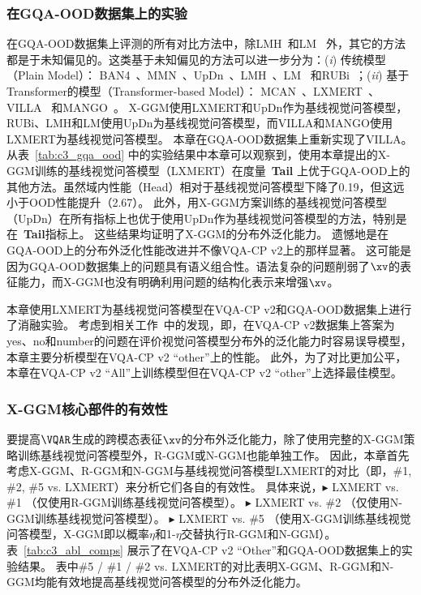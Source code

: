 \subsubsection{在GQA-OOD数据集上的实验}
在GQA-OOD数据集上评测的所有对比方法中，除LMH~\cite{clark2019don}和LM~\cite{clark2019don} 外，其它的方法都是于未知偏见的。这类基于未知偏见的方法可以进一步分为：(\emph{i}) 传统模型（Plain Model）： BAN4~\cite{kim2018bilinear}、MMN~\cite{chen2021meta}、UpDn~\cite{anderson2018bottom}、LMH~\cite{clark2019don}、LM~\cite{clark2019don} 和RUBi~\cite{cadene2019rubi}；(\emph{ii}) 基于Transformer的模型（Transformer-based Model）： MCAN~\cite{yu2019deep}、LXMERT~\cite{tan2019lxmert}、VILLA~\cite{gan2020large} 和MANGO~\cite{li2020closer}。
X-GGM使用LXMERT和UpDn作为基线视觉问答模型，RUBi、LMH和LM使用UpDn为基线视觉问答模型，而VILLA和MANGO使用LXMERT为基线视觉问答模型。
本章在GQA-OOD数据集上重新实现了VILLA。
从表~\ref{tab:c3_gqa_ood} 中的实验结果中本章可以观察到，使用本章提出的X-GGM训练的基线视觉问答模型（LXMERT）在度量~\textbf{Tail} 上优于GQA-OOD上的其他方法。虽然域内性能（Head）相对于基线视觉问答模型下降了0.19，但这远小于OOD性能提升（2.67）。
此外，用X-GGM方案训练的基线视觉问答模型（UpDn）在所有指标上也优于使用UpDn作为基线视觉问答模型的方法，特别是在~\textbf{Tail}指标上。
这些结果均证明了X-GGM的分布外泛化能力。
遗憾地是在GQA-OOD上的分布外泛化性能改进并不像VQA-CP v2上的那样显著。
这可能是因为GQA-OOD数据集上的问题具有语义组合性。语法复杂的问题削弱了$\xv$的表征能力，而X-GGM也没有明确利用问题的结构化表示来增强$\xv$。





本章使用LXMERT为基线视觉问答模型在VQA-CP v2和GQA-OOD数据集上进行了消融实验。
考虑到相关工作~\cite{teney2020value}中的发现，即，在VQA-CP v2数据集上答案为yes、no和number的问题在评价视觉问答模型分布外的泛化能力时容易误导模型，本章主要分析模型在VQA-CP v2 ``other''上的性能。
此外，为了对比更加公平，本章在VQA-CP v2 ``All''上训练模型但在VQA-CP v2 ``other''上选择最佳模型。


\subsubsection{X-GGM核心部件的有效性}
要提高$\VQAR$生成的跨模态表征$\xv$的分布外泛化能力，除了使用完整的X-GGM策略训练基线视觉问答模型外，R-GGM或N-GGM也能单独工作。
因此，本章首先考虑X-GGM、R-GGM和N-GGM与基线视觉问答模型LXMERT的对比（即，\#1, \#2, \#5 vs. LXMERT）来分析它们各自的有效性。
具体来说，$\blacktriangleright$ LXMERT vs. \#1 （仅使用R-GGM训练基线视觉问答模型）。
$\blacktriangleright$ LXMERT vs. \#2 （仅使用N-GGM训练基线视觉问答模型）。
$\blacktriangleright$ LXMERT vs. \#5 （使用X-GGM训练基线视觉问答模型，X-GGM即以概率$\eta$和1-$\eta$交替执行R-GGM和N-GGM）。
表~\ref{tab:c3_abl_comps} 展示了在VQA-CP v2 ``Other''和GQA-OOD数据集上的实验结果。
表中\#5 / \#1 / \#2 vs. LXMERT的对比表明X-GGM、R-GGM和N-GGM均能有效地提高基线视觉问答模型的分布外泛化能力。

